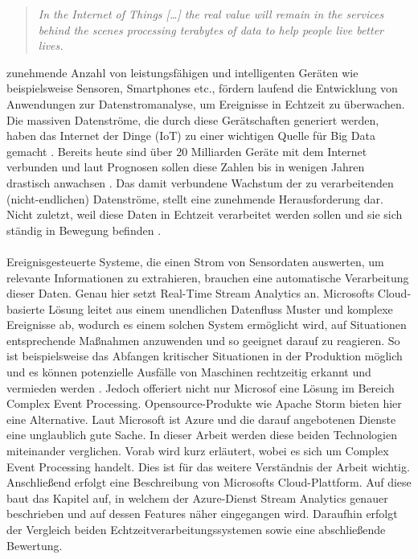
\begin{quote} \textit{\glqq In the Internet of Things […] the real value will remain in the services behind the scenes processing terabytes of data to help people live better lives. \grqq~}\cite{Floarea.2014}\\ \end{quote} 

 zunehmende Anzahl von leistungsfähigen und intelligenten Geräten wie beispielsweise Sensoren, Smartphones etc., fördern laufend die Entwicklung von Anwendungen zur Datenstromanalyse, um Ereignisse in Echtzeit zu überwachen. Die massiven Datenströme, die durch diese Gerätschaften generiert werden, haben das Internet der Dinge (IoT) zu einer wichtigen Quelle für Big Data gemacht \cite{Prosise.}. Bereits heute sind über 20 Milliarden Geräte mit dem Internet verbunden und laut Prognosen sollen diese Zahlen bis in wenigen Jahren drastisch anwachsen \cite{Statista.2017}. Das damit verbundene Wachstum der zu verarbeitenden (nicht-endlichen) Datenströme, stellt eine zunehmende Herausforderung dar. Nicht zuletzt, weil diese Daten in Echtzeit verarbeitet werden sollen und sie sich ständig in Bewegung befinden \cite{Prosise.}.\\ \\ Ereignisgesteuerte Systeme, die einen Strom von Sensordaten auswerten, um relevante Informationen zu extrahieren, brauchen eine automatische Verarbeitung dieser Daten. Genau hier setzt Real-Time Stream Analytics an. Microsofts Cloud-basierte Lösung leitet aus einem unendlichen Datenfluss Muster und komplexe Ereignisse ab, wodurch es einem solchen System ermöglicht wird, auf Situationen entsprechende Maßnahmen anzuwenden und so geeignet darauf zu reagieren. So ist beispielsweise das Abfangen kritischer Situationen in der Produktion möglich und es können potenzielle Ausfälle von Maschinen rechtzeitig erkannt und vermieden werden \cite{rcrwireless.2016}. Jedoch offeriert nicht nur Microsof eine Lösung im Bereich Complex Event Processing. Opensource-Produkte wie Apache Storm bieten hier eine Alternative. Laut Microsoft ist Azure und die darauf angebotenen Dienste eine unglaublich gute Sache. In dieser Arbeit werden diese beiden Technologien miteinander verglichen. Vorab wird kurz erläutert, wobei es sich um Complex Event Processing handelt. Dies ist für das weitere Verständnis der Arbeit wichtig. Anschließend erfolgt eine Beschreibung von Microsofts Cloud-Plattform. Auf diese baut das Kapitel auf, in welchem der Azure-Dienst Stream Analytics genauer beschrieben und auf dessen Features näher eingegangen wird. Daraufhin erfolgt der Vergleich beiden Echtzeitverarbeitungssystemen sowie eine abschließende Bewertung. 